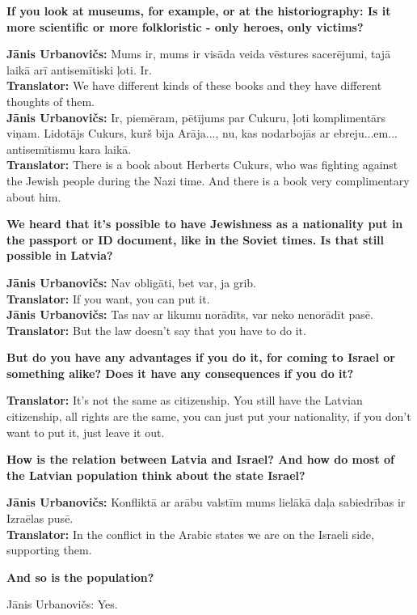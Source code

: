 \textbf{If you look at museums, for example, or at the historiography: Is it more scientific or more folkloristic - only heroes, only victims?}  

\textbf{Jānis Urbanovičs:} Mums ir, mums ir visāda veida vēstures sacerējumi, tajā laikā arī antisemītiski ļoti. Ir.\\ 
\textbf{Translator:} We have different kinds of these books and they have different thoughts of them. \\
\textbf{Jānis Urbanovičs:} Ir, piemēram, pētījums par Cukuru, ļoti komplimentārs viņam. Lidotājs Cukurs, kurš bija Arāja..., nu, kas nodarbojās ar ebreju...em... antisemītismu kara laikā.\\  
\textbf{Translator:} There is a book about Herberts Cukurs, who was fighting against the Jewish people during the Nazi time. And there is a book very complimentary about him. 

\textbf{We heard that it's possible to have Jewishness as a nationality put in the passport or ID document, like in the Soviet times. Is that still possible in Latvia?}  

\textbf{Jānis Urbanovičs:} Nav obligāti, bet var, ja grib.\\
\textbf{Translator:} If you want, you can put it.\\ 
\textbf{Jānis Urbanovičs:} Tas nav ar likumu norādīts, var neko nenorādīt pasē.\\ 
\textbf{Translator:} But the law doesn't say that you have to do it.  

\textbf{But do you have any advantages if you do it, for coming to Israel or something alike? Does it have any consequences if you do it?}  

\textbf{Translator:} It’s not the same as citizenship. You still have the Latvian citizenship, all rights are the same, you can just put your nationality, if you don't want to put it, just leave it out.  

\textbf{How is the relation between Latvia and Israel? And how do most of the Latvian population think about the state Israel?} 

\textbf{Jānis Urbanovičs:} Konfliktā ar arābu valstīm mums lielākā daļa sabiedrības ir Izraēlas pusē.\\
\textbf{Translator:} In the conflict in the Arabic states we are on the Israeli side, supporting them.  

\textbf{And so is the population?} 

Jānis Urbanovičs: Yes. 

